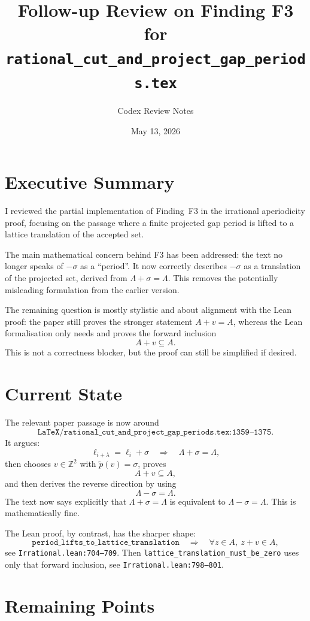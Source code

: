 \documentclass[11pt]{article}
\title{Follow-up Review on Finding F3 for\\
\texttt{rational\_cut\_and\_project\_gap\_periods.tex}}
\author{Codex Review Notes}
\date{May 13, 2026}
\begin{document}
\maketitle

\section*{Executive Summary}

I reviewed the partial implementation of Finding~F3 in the irrational
aperiodicity proof, focusing on the passage where a finite projected gap
period is lifted to a lattice translation of the accepted set.

The main mathematical concern behind F3 has been addressed: the text no
longer speaks of \(-\sigma\) as a ``period''.  It now correctly describes
\(-\sigma\) as a translation of the projected set, derived from
\(\Lambda+\sigma=\Lambda\).  This removes the potentially misleading
formulation from the earlier version.

The remaining question is mostly stylistic and about alignment with the Lean
proof: the paper still proves the stronger statement \(A+v=A\), whereas the
Lean formalisation only needs and proves the forward inclusion
\[
  A+v\subseteq A.
\]
This is not a correctness blocker, but the proof can still be simplified if
desired.

\section*{Current State}

The relevant paper passage is now around
\[
\texttt{LaTeX/rational\_cut\_and\_project\_gap\_periods.tex:1359--1375}.
\]
It argues:
\[
  \ell_{i+\lambda}=\ell_i+\sigma
  \quad\Longrightarrow\quad
  \Lambda+\sigma=\Lambda,
\]
then chooses \(v\in\mathbb Z^2\) with \(\tilde p(v)=\sigma\), proves
\[
  A+v\subseteq A,
\]
and then derives the reverse direction by using
\[
  \Lambda-\sigma=\Lambda.
\]
The text now says explicitly that \(\Lambda+\sigma=\Lambda\) is equivalent
to \(\Lambda-\sigma=\Lambda\).  This is mathematically fine.

The Lean proof, by contrast, has the sharper shape:
\[
\texttt{period\_lifts\_to\_lattice\_translation}
\quad\Rightarrow\quad
\forall z\in A,\ z+v\in A,
\]
see \texttt{Irrational.lean:704--709}.  Then
\texttt{lattice\_translation\_must\_be\_zero} uses only that forward
inclusion, see \texttt{Irrational.lean:798--801}.

\section*{Remaining Points}
\end{document}
